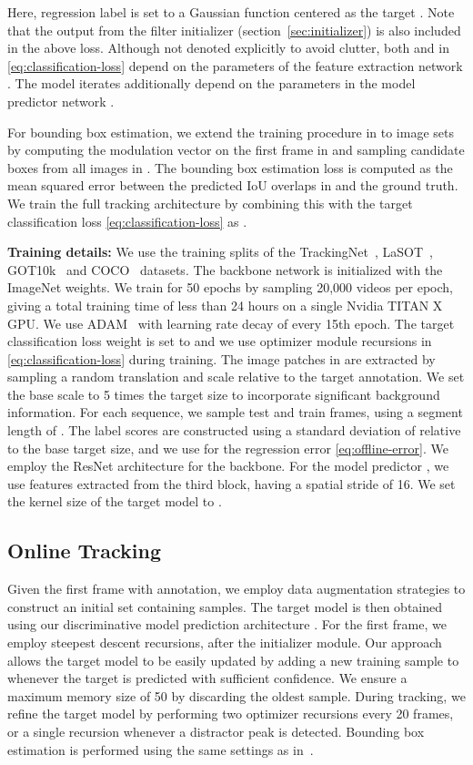 \documentclass[10pt,twocolumn,letterpaper]{article}
\begin{document}
Here, regression label  is set to a Gaussian function centered as the target . Note that the output  from the filter initializer (section~\ref{sec:initializer}) is also included in the above loss. Although not denoted explicitly to avoid clutter, both  and  in \eqref{eq:classification-loss} depend on the parameters of the feature extraction network . The model iterates  additionally depend on the parameters in the model predictor network . 

For bounding box estimation, we extend the training procedure in \cite{ATOM} to image sets by computing the modulation vector on the first frame in  and sampling candidate boxes from all images in . The bounding box estimation loss  is computed as the mean squared error between the predicted IoU overlaps in  and the ground truth. We train the full tracking architecture by combining this with the target classification loss \eqref{eq:classification-loss} as .

\noindent\textbf{Training details:}
We use the training splits of the TrackingNet~\cite{TrackingNet}, LaSOT~\cite{LaSOT}, GOT10k~\cite{GOT10k} and COCO~\cite{COCO} datasets. The backbone network is initialized with the ImageNet weights. We train for 50 epochs by sampling 20,000 videos per epoch, giving a total training time of less than 24 hours on a single Nvidia TITAN X GPU. We use ADAM~\cite{ADAM} with learning rate decay of  every 15th epoch. The target classification loss weight is set to  and we use  optimizer module recursions in \eqref{eq:classification-loss} during training.
The image patches in  are extracted by sampling a random translation and scale relative to the target annotation. We set the base scale to 5 times the target size to incorporate significant background information. For each sequence, we sample  test and train frames, using a segment length of . The label scores  are constructed using a standard deviation of  relative to the base target size, and we use  for the regression error \eqref{eq:offline-error}. We employ the ResNet architecture for the backbone. For the model predictor , we use features extracted from the third block, having a spatial stride of 16. We set the kernel size of the target model  to . 

\subsection{Online Tracking}
\label{sec:online_tracking}
Given the first frame with annotation, we employ data augmentation strategies \cite{BhatECCV2018} to construct an initial set  containing  samples. The target model is then obtained using our discriminative model prediction architecture . For the first frame, we employ  steepest descent recursions, after the initializer module. Our approach allows the target model to be easily updated by adding a new training sample to  whenever the target is predicted with sufficient confidence. We ensure a maximum memory size of 50 by discarding the oldest sample. During tracking, we refine the target model  by performing two optimizer recursions every 20 frames, or a single recursion whenever a distractor peak is detected. Bounding box estimation is performed using the same settings as in~\cite{ATOM}.
\end{document}
